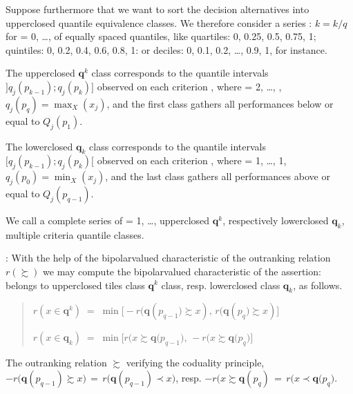 \documentclass[a4paper,12pt,english]{sphinxhowto}
\begin{document}
Suppose furthermore that we want to sort the decision alternatives into  upper\sphinxhyphen{}closed quantile equivalence classes. We therefore consider a series : \(k = k/q\) for  = 0, …,  of  equally spaced quantiles, like quartiles: 0, 0.25, 0.5, 0.75, 1; quintiles: 0, 0.2, 0.4, 0.6, 0.8, 1: or deciles: 0, 0.1, 0.2, …, 0.9, 1, for instance.

The upper\sphinxhyphen{}closed \(\mathbf{q}^k\) class corresponds to the  quantile intervals \(]q_j(p_{k-1});q_j(p_k)]\) observed on each criterion ,  where  = 2, …,  , \(q_j(p_q) =  \max_X(x_j)\), and the first class gathers all performances below or equal to \(Q_j(p_1)\).

The lower\sphinxhyphen{}closed \(\mathbf{q}_k\) class corresponds to the  quantile intervals \([q_j(p_{k-1});q_j(p_k)[\) observed on each criterion , where  = 1, …, \sphinxhyphen{}1, \(q_j(p_0) = \min_X(x_j)\), and the last class gathers all performances above or equal to \(Q_j(p_{q-1})\).

We call  a complete series of  = 1, …,  upper\sphinxhyphen{}closed \(\mathbf{q}^k\), respectively lower\sphinxhyphen{}closed \(\mathbf{q}_k\), multiple criteria quantile classes.

: With the help of the bipolar\sphinxhyphen{}valued characteristic of the outranking relation \(r(\succsim)\) we may compute the bipolar\sphinxhyphen{}valued characteristic of the assertion:  belongs to upper\sphinxhyphen{}closed \sphinxhyphen{}tiles class \(\mathbf{q}^k\) class, resp. lower\sphinxhyphen{}closed class \(\mathbf{q}_k\), as follows.
\begin{quote}

\(r(x \in \mathbf{q}^k) \; = \; \min \big[ -r\big(\mathbf{q}(p_{q-1}\big) \succsim x), \,r\big(\mathbf{q}(p_{q}\big) \succsim x)\big]\)

\(r(x \in \mathbf{q}_k) \; = \; \min \big[ r\big(x \succsim \mathbf{q}(p_{q-1}\big),\, -r\big(x \succsim\mathbf{q}(p_{q}\big)\big]\)
\end{quote}

The outranking relation \(\succsim\) verifying the coduality principle, \(-r\big(\mathbf{q}(p_{q-1}) \succsim x\big) \,=\, r\big(\mathbf{q}(p_{q-1}) \prec x\big)\), resp. \(-r\big(x \succsim \mathbf{q}(p_{q}) \,=\, r\big(x \prec \mathbf{q}(p_{q}\big)\).
\end{document}
